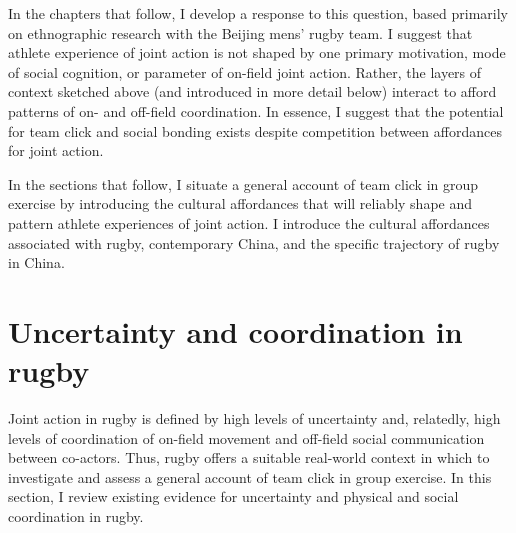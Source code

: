 \begin{CJK}{UTF8}{gbsn}
In the chapters that follow, I develop a response to this question, based primarily on ethnographic research with the Beijing mens’ rugby team.  I suggest that athlete experience of joint action is not shaped by one primary motivation, mode of social cognition, or parameter of on-field joint action. Rather, the layers of context sketched above (and introduced in more detail below) interact to afford patterns of on- and off-field coordination.  In essence, I suggest that the potential for team click and social bonding exists despite competition between affordances for joint action.

In the sections that follow, I situate a general account of team click in group exercise by introducing the cultural affordances that will reliably shape and pattern athlete experiences of joint action.  I introduce the cultural affordances associated with rugby, contemporary China, and the specific trajectory of rugby in China.


\section{Uncertainty and coordination in rugby\label{sect:rugbyUnion}}
Joint action in rugby is defined by high levels of uncertainty and, relatedly, high levels of coordination of on-field movement and off-field social communication between co-actors.  Thus, rugby offers a suitable real-world context in which to investigate and assess a general account of team click in group exercise.  In this section, I review existing evidence for uncertainty and physical and social coordination in rugby.


\end{CJK}
